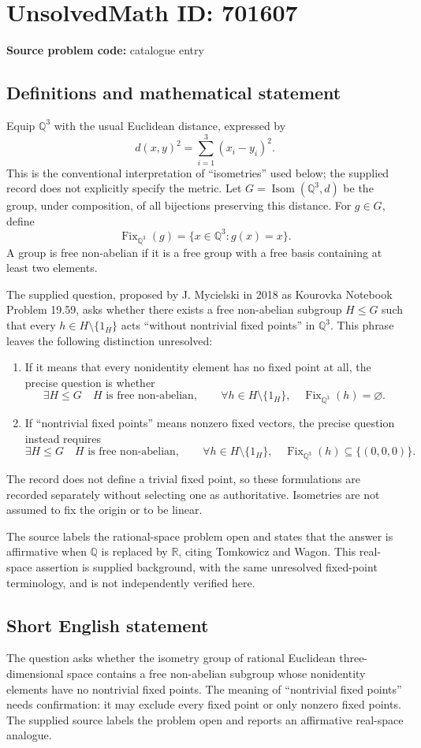 \documentclass[11pt]{article}
\newcommand{\Q}{\mathbb{Q}}
\newcommand{\R}{\mathbb{R}}
\begin{document}
\section*{UnsolvedMath ID: 701607}
\textbf{Source problem code:} catalogue entry
\subsection{Definitions and mathematical statement}
Equip \(\Q^3\) with the usual Euclidean distance, expressed by
\[
 d(x,y)^2=\sum_{i=1}^{3}(x_i-y_i)^2.
\]
This is the conventional interpretation of ``isometries'' used below; the supplied record does not explicitly specify the metric. Let \(G=\operatorname{Isom}(\Q^3,d)\) be the group, under composition, of all bijections preserving this distance. For \(g\in G\), define
\[
 \operatorname{Fix}_{\Q^3}(g)=\{x\in\Q^3:g(x)=x\}.
\]
A group is free non-abelian if it is a free group with a free basis containing at least two elements.

The supplied question, proposed by J. Mycielski in 2018 as Kourovka Notebook Problem 19.59, asks whether there exists a free non-abelian subgroup \(H\leq G\) such that every \(h\in H\setminus\{1_H\}\) acts ``without nontrivial fixed points'' in \(\Q^3\). This phrase leaves the following distinction unresolved:
\begin{enumerate}
\item If it means that every nonidentity element has no fixed point at all, the precise question is whether
\[
 \exists H\leq G\quad
 H\text{ is free non-abelian},\qquad
 \forall h\in H\setminus\{1_H\},\quad
 \operatorname{Fix}_{\Q^3}(h)=\varnothing.
\]
\item If ``nontrivial fixed points'' means nonzero fixed vectors, the precise question instead requires
\[
 \exists H\leq G\quad
 H\text{ is free non-abelian},\qquad
 \forall h\in H\setminus\{1_H\},\quad
 \operatorname{Fix}_{\Q^3}(h)\subseteq\{(0,0,0)\}.
\]
\end{enumerate}
The record does not define a trivial fixed point, so these formulations are recorded separately without selecting one as authoritative. Isometries are not assumed to fix the origin or to be linear.

The source labels the rational-space problem open and states that the answer is affirmative when \(\Q\) is replaced by \(\R\), citing Tomkowicz and Wagon. This real-space assertion is supplied background, with the same unresolved fixed-point terminology, and is not independently verified here.
\subsection{Short English statement}
The question asks whether the isometry group of rational Euclidean three-dimensional space contains a free non-abelian subgroup whose nonidentity elements have no nontrivial fixed points. The meaning of ``nontrivial fixed points'' needs confirmation: it may exclude every fixed point or only nonzero fixed points. The supplied source labels the problem open and reports an affirmative real-space analogue.
\end{document}
